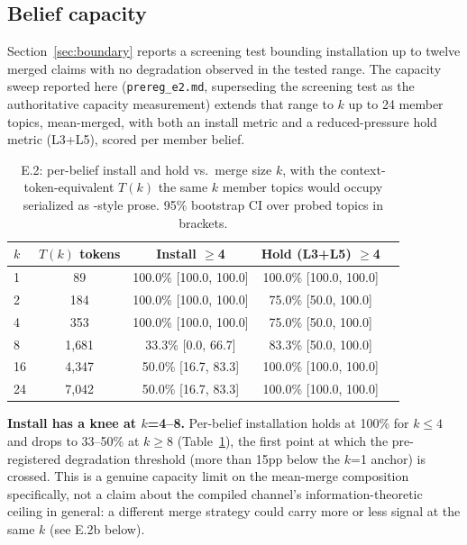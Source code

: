 \subsection{Belief capacity}
\label{app:capacity}

Section~\ref{sec:boundary} reports a screening test bounding installation up to twelve
merged claims with no degradation observed in the tested range. The capacity sweep
reported here (\texttt{prereg\_e2.md}, superseding the screening test as the
authoritative capacity measurement) extends that range to \(k\) up to 24 member topics,
mean-merged, with both an install metric and a reduced-pressure hold metric (L3+L5),
scored per member belief.

\begin{table}[h]
\centering
\caption{E.2: per-belief install and hold vs.\ merge size \(k\), with the
context-token-equivalent \(T(k)\) the same \(k\) member topics would occupy serialized as
\condB{}-style prose. 95\% bootstrap CI over probed topics in brackets.}
\label{tab:e2-capacity}
\begin{tabular}{lcccc}
\toprule
\(k\) & \(T(k)\) tokens & Install \(\ge\)4 & Hold (L3+L5) \(\ge\)4 \\
\midrule
1 & 89 & 100.0\% [100.0, 100.0] & 100.0\% [100.0, 100.0] \\
2 & 184 & 100.0\% [100.0, 100.0] & 75.0\% [50.0, 100.0] \\
4 & 353 & 100.0\% [100.0, 100.0] & 75.0\% [50.0, 100.0] \\
8 & 1{,}681 & 33.3\% [0.0, 66.7] & 83.3\% [50.0, 100.0] \\
16 & 4{,}347 & 50.0\% [16.7, 83.3] & 100.0\% [100.0, 100.0] \\
24 & 7{,}042 & 50.0\% [16.7, 83.3] & 100.0\% [100.0, 100.0] \\
\bottomrule
\end{tabular}
\end{table}

\textbf{Install has a knee at \(k\)=4--8.} Per-belief installation holds at 100\% for
\(k \le 4\) and drops to 33--50\% at \(k \ge 8\) (Table~\ref{tab:e2-capacity}), the first
point at which the pre-registered degradation threshold (more than 15pp below the
\(k\)=1 anchor) is crossed. This is a genuine capacity limit on the mean-merge
composition specifically, not a claim about the compiled channel's information-theoretic
ceiling in general: a different merge strategy could carry more or less signal at the
same \(k\) (see E.2b below).

